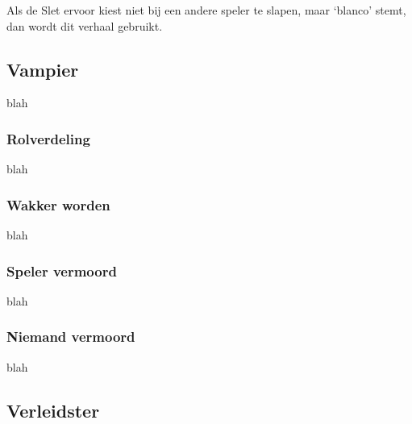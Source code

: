 \documentclass[12pt]{article}
\begin{document}
      Als de Slet ervoor kiest niet bij een andere speler te slapen, maar `blanco' stemt, dan wordt dit verhaal gebruikt.
    
      \begin{center}
      \end{center}
  
  \subsection{Vampier}
    
      blah
  
    \subsubsection{Rolverdeling}
    
      blah
    
    \subsubsection{Wakker worden}
    
      blah
    
    \subsubsection{Speler vermoord}
    
      blah
    
    \subsubsection{Niemand vermoord}
    
      blah
  
  \subsection{Verleidster}
    
\end{document}
